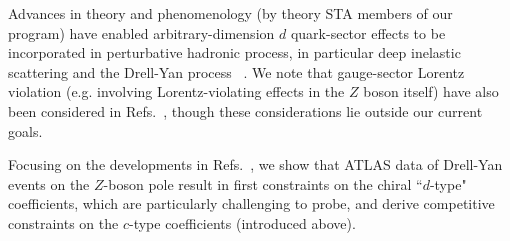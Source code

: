 Advances in theory and phenomenology (by
theory STA members of our program)
have enabled arbitrary-dimension $d$
quark-sector effects to be incorporated in
perturbative hadronic process, in particular
deep inelastic scattering and the Drell-Yan process 
~\cite{Kostelecky:2016pyx, Lunghi:2018uwj, Kostelecky:2019fse,lssv21}. 
We note that gauge-sector Lorentz violation (e.g. involving Lorentz-violating effects
in the $Z$ boson itself) have also
been considered in Refs.~\cite{Fu:2016fmf, Colladay:2017zen, Michel:2019tti}, 
though these considerations lie outside our current goals.

Focusing on the developments in
Refs.~\cite{Kostelecky:2016pyx, Lunghi:2018uwj, Kostelecky:2019fse,lssv21}, 
we show that ATLAS data of Drell-Yan 
events on the $Z$-boson pole result 
in first constraints on the chiral ``$d$-type" coefficients, 
which are particularly challenging to probe, 
and derive competitive constraints on
the $c$-type coefficients (introduced above). 
%
%
